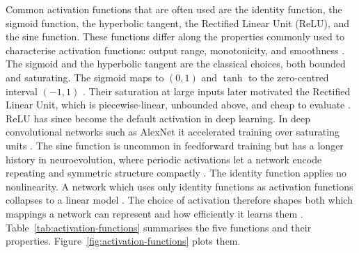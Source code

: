 \documentclass[12pt]{article}
\begin{document}
Common activation functions that are often used are the identity function, the sigmoid function, the hyperbolic tangent, the Rectified Linear Unit (ReLU), and the sine function.
These functions differ along the properties commonly used to characterise activation functions: output range, monotonicity, and smoothness \parencite{dubey_activation_2022}.
The sigmoid and the hyperbolic tangent are the classical choices, both bounded and saturating. The sigmoid maps to $(0,1)$ and $\tanh$ to the zero-centred interval $(-1,1)$ \parencite{dubey_activation_2022}.
Their saturation at large inputs later motivated the Rectified Linear Unit, which is piecewise-linear, unbounded above, and cheap to evaluate \parencite{nair_rectified_2010}.
ReLU has since become the default activation in deep learning. In deep convolutional networks such as AlexNet it accelerated training over saturating units \parencite{krizhevsky_imagenet_2012,ramachandran_searching_2017}.
The sine function is uncommon in feedforward training but has a longer history in neuroevolution, where periodic activations let a network encode repeating and symmetric structure compactly \parencite{stanley_compositional_2007}.
The identity function applies no nonlinearity. A network which uses only identity functions as activation functions collapses to a linear model \parencite{dubey_activation_2022}.
The choice of activation therefore shapes both which mappings a network can represent and how efficiently it learns them \parencite{dubey_activation_2022}.
Table~\ref{tab:activation-functions} summarises the five functions and their properties. Figure~\ref{fig:activation-functions} plots them.
\end{document}
